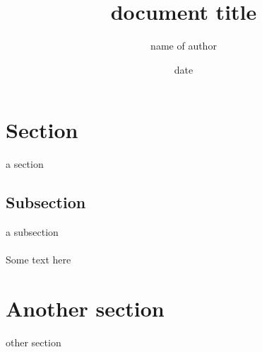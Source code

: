 \documentclass{article}
\title{document title}
\date{date}
\author{name of author}
\begin{document}
	\maketitle
	
	\section{Section}
	a section
	
	\subsection{Subsection}
	a subsection

	\paragraph{}
	Some text here

	\section{Another section}
	other section
\end{document}
